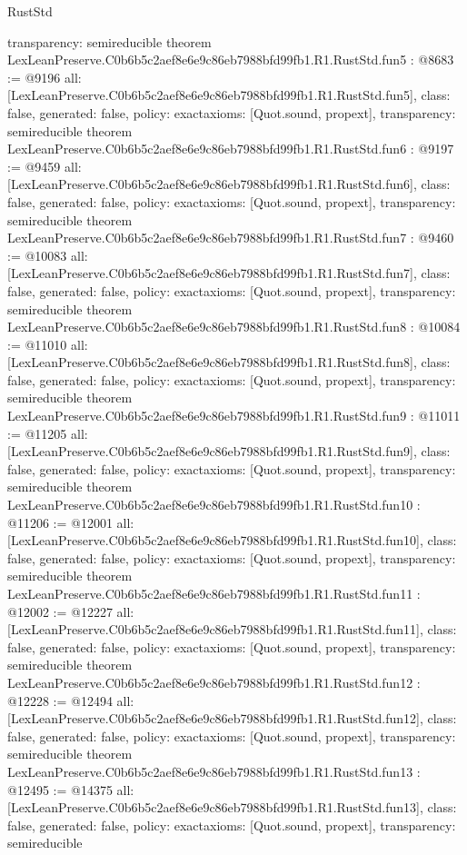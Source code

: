 \begin{lexlean}{RustStd}
\begin{coremodule}
{  transparency: semireducible
}
theorem LexLeanPreserve.C0b6b5c2aef8e6e9c86eb7988bfd99fb1.R1.RustStd.fun5 : @8683 := @9196 {
  all: [LexLeanPreserve.C0b6b5c2aef8e6e9c86eb7988bfd99fb1.R1.RustStd.fun5],
  class: false,
  generated: false,
  policy: exact{axioms: [Quot.sound, propext]},
  transparency: semireducible
}
theorem LexLeanPreserve.C0b6b5c2aef8e6e9c86eb7988bfd99fb1.R1.RustStd.fun6 : @9197 := @9459 {
  all: [LexLeanPreserve.C0b6b5c2aef8e6e9c86eb7988bfd99fb1.R1.RustStd.fun6],
  class: false,
  generated: false,
  policy: exact{axioms: [Quot.sound, propext]},
  transparency: semireducible
}
theorem LexLeanPreserve.C0b6b5c2aef8e6e9c86eb7988bfd99fb1.R1.RustStd.fun7 : @9460 := @10083 {
  all: [LexLeanPreserve.C0b6b5c2aef8e6e9c86eb7988bfd99fb1.R1.RustStd.fun7],
  class: false,
  generated: false,
  policy: exact{axioms: [Quot.sound, propext]},
  transparency: semireducible
}
theorem LexLeanPreserve.C0b6b5c2aef8e6e9c86eb7988bfd99fb1.R1.RustStd.fun8 : @10084 := @11010 {
  all: [LexLeanPreserve.C0b6b5c2aef8e6e9c86eb7988bfd99fb1.R1.RustStd.fun8],
  class: false,
  generated: false,
  policy: exact{axioms: [Quot.sound, propext]},
  transparency: semireducible
}
theorem LexLeanPreserve.C0b6b5c2aef8e6e9c86eb7988bfd99fb1.R1.RustStd.fun9 : @11011 := @11205 {
  all: [LexLeanPreserve.C0b6b5c2aef8e6e9c86eb7988bfd99fb1.R1.RustStd.fun9],
  class: false,
  generated: false,
  policy: exact{axioms: [Quot.sound, propext]},
  transparency: semireducible
}
theorem LexLeanPreserve.C0b6b5c2aef8e6e9c86eb7988bfd99fb1.R1.RustStd.fun10 : @11206 := @12001 {
  all: [LexLeanPreserve.C0b6b5c2aef8e6e9c86eb7988bfd99fb1.R1.RustStd.fun10],
  class: false,
  generated: false,
  policy: exact{axioms: [Quot.sound, propext]},
  transparency: semireducible
}
theorem LexLeanPreserve.C0b6b5c2aef8e6e9c86eb7988bfd99fb1.R1.RustStd.fun11 : @12002 := @12227 {
  all: [LexLeanPreserve.C0b6b5c2aef8e6e9c86eb7988bfd99fb1.R1.RustStd.fun11],
  class: false,
  generated: false,
  policy: exact{axioms: [Quot.sound, propext]},
  transparency: semireducible
}
theorem LexLeanPreserve.C0b6b5c2aef8e6e9c86eb7988bfd99fb1.R1.RustStd.fun12 : @12228 := @12494 {
  all: [LexLeanPreserve.C0b6b5c2aef8e6e9c86eb7988bfd99fb1.R1.RustStd.fun12],
  class: false,
  generated: false,
  policy: exact{axioms: [Quot.sound, propext]},
  transparency: semireducible
}
theorem LexLeanPreserve.C0b6b5c2aef8e6e9c86eb7988bfd99fb1.R1.RustStd.fun13 : @12495 := @14375 {
  all: [LexLeanPreserve.C0b6b5c2aef8e6e9c86eb7988bfd99fb1.R1.RustStd.fun13],
  class: false,
  generated: false,
  policy: exact{axioms: [Quot.sound, propext]},
  transparency: semireducible
}
\end{coremodule}
\end{lexlean}
